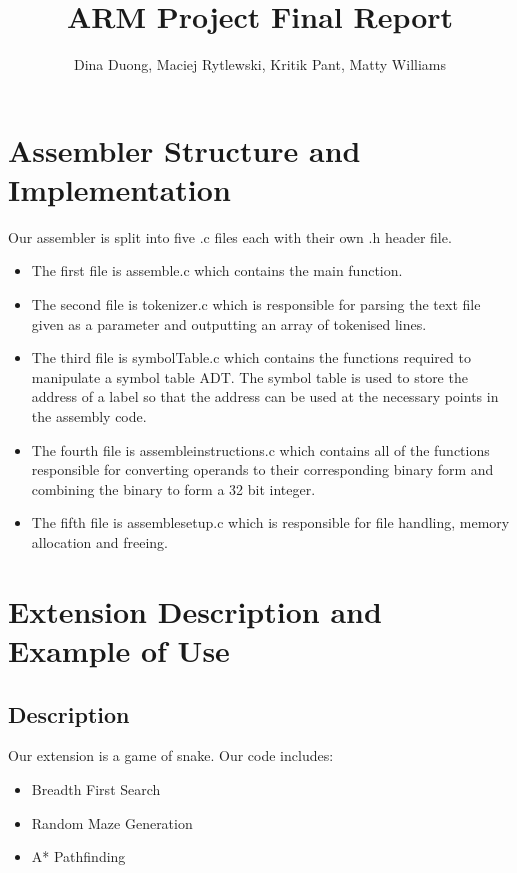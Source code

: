 \documentclass[11pt]{article}
\begin{document}
\title{
    \vspace{-2cm}
    ARM Project Final Report}
\author{Dina Duong, Maciej Rytlewski, Kritik Pant, Matty Williams}

\maketitle

\section{Assembler Structure and Implementation}

Our assembler is split into five .c files each with their own .h header file.

\begin{itemize}
    \item The first file is assemble.c which contains the main function.
    \item The second file is tokenizer.c which is responsible for parsing the text file given as a parameter and outputting an array of tokenised lines.
    \item The third file is symbolTable.c which contains the functions required to manipulate a symbol table ADT. The symbol table is used to store the address of a label so that the address can be used at the necessary points in the assembly code.
    \item The fourth file is assembleinstructions.c which contains all of the functions responsible for converting operands to their corresponding binary form and combining the binary to form a 32 bit integer.
    \item The fifth file is assemblesetup.c which is responsible for file handling, memory allocation and freeing. 
\end{itemize}

\section{Extension Description and Example of Use}

\subsection{Description}

Our extension is a game of snake. Our code includes:

\begin{itemize}
    \item Breadth First Search
    \item Random Maze Generation
    \item A* Pathfinding
\end{itemize}
\end{document}
